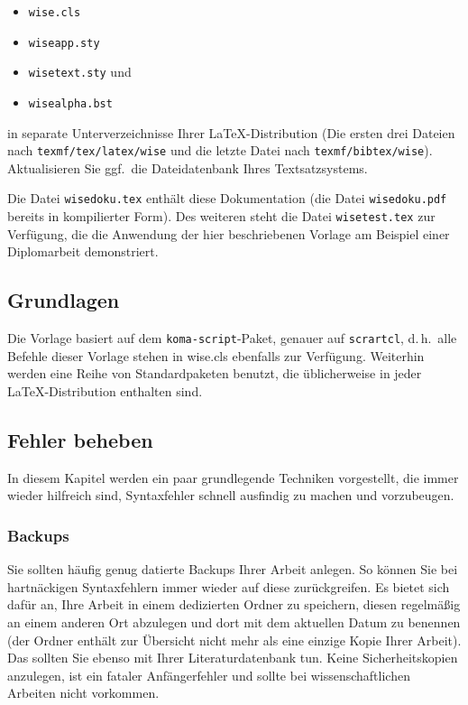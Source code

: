 \documentclass[english, trackchanges, hyperref, ngerman ,pdf, mp, mppdf]{wise}
\newcommand\code[1]{\texttt{#1}}
\begin{document}
\begin{itemize}
\item \code{wise.cls}
\item \code{wiseapp.sty}
\item \code{wisetext.sty} und
\item \code{wisealpha.bst}
\end{itemize}


in separate Unterverzeichnisse Ihrer \LaTeX{}-Distribution (Die ersten
drei Dateien nach \linebreak{}\code{texmf/tex/latex/wise} und die letzte
Datei nach \code{texmf/bibtex/wise}). Aktualisieren Sie
ggf.\ die Dateidatenbank Ihres Textsatzsystems.

Die Datei \code{wisedoku.tex} enthält
diese Dokumentation (die Datei \code{wisedoku.pdf} bereits in kompilierter
Form). Des weiteren steht die Datei \code{wisetest.tex} zur Verfügung,
die die Anwendung der hier beschriebenen Vorlage am Beispiel einer
Diplomarbeit demonstriert.

\subsection{Grundlagen}\label{sec:basics}
Die Vorlage basiert auf dem \code{koma-script}-Paket, genauer auf
\code{scrartcl}, d.\,h.\ alle Befehle dieser Vorlage stehen in
wise.cls ebenfalls zur Verfügung. Weiterhin werden eine Reihe von
Standardpaketen benutzt, die üblicherweise in jeder \LaTeX{}-Distribution
enthalten sind.

\subsection{Fehler beheben}

In diesem Kapitel werden ein paar grundlegende Techniken vorgestellt, die immer wieder hilfreich sind, Syntaxfehler schnell ausfindig zu machen und vorzubeugen. 

\subsubsection{Backups}
Sie sollten häufig genug datierte Backups Ihrer Arbeit anlegen. So können Sie bei hartnäckigen Syntaxfehlern immer wieder auf diese zurückgreifen. Es bietet sich dafür an, Ihre Arbeit in einem dedizierten Ordner zu speichern, diesen regelmäßig an einem anderen Ort abzulegen und dort mit dem aktuellen Datum zu benennen (der Ordner enthält zur Übersicht nicht mehr als eine einzige Kopie Ihrer Arbeit).  Das sollten Sie ebenso mit Ihrer Literaturdatenbank tun. Keine Sicherheitskopien anzulegen, ist ein fataler Anfängerfehler und sollte bei wissenschaftlichen Arbeiten nicht vorkommen.
\end{document}
